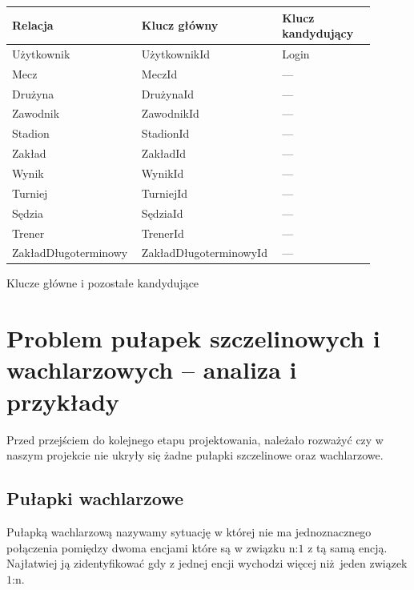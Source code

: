 \documentclass{mwrep}
\begin{document}
\vspace{1cm}
\begin{threeparttable}[H]
	\begin{tabular}{|p{0.3\linewidth}|p{0.35\linewidth}|p{0.25\linewidth}|}
	\hline
	Relacja & Klucz główny & Klucz kandydujący \\ \hline
	Użytkownik & UżytkownikId & Login \\ \hline
	Mecz & MeczId & \hfil--- \\ \hline
	Drużyna & DrużynaId & \hfil--- \\ \hline
	Zawodnik & ZawodnikId & \hfil--- \\ \hline
	Stadion & StadionId & \hfil--- \\ \hline
	Zakład & ZakładId & \hfil--- \\ \hline
	Wynik & WynikId & \hfil--- \\ \hline
	Turniej & TurniejId & \hfil--- \\ \hline
	Sędzia & SędziaId & \hfil--- \\ \hline
	Trener & TrenerId & \hfil--- \\ \hline
	ZakładDługoterminowy & ZakładDługoterminowyId & \hfil--- \\ \hline
	\end{tabular}	
	\caption{Klucze główne i pozostałe kandydujące}
\end{threeparttable}
\vspace{1cm}

\newpage

\section{Problem pułapek szczelinowych i wachlarzowych – analiza i przykłady}
Przed przejściem do kolejnego etapu projektowania, należało rozważyć czy w naszym projekcie
nie ukryły się żadne pułapki szczelinowe oraz wachlarzowe. 


\subsection{Pułapki wachlarzowe}
Pułapką wachlarzową nazywamy sytuację w której nie ma jednoznacznego połączenia pomiędzy dwoma encjami które 
są w związku n:$1$ z tą samą encją. Najłatwiej ją zidentyfikować gdy z jednej encji wychodzi więcej niż jeden związek $1$:n.
\end{document}
